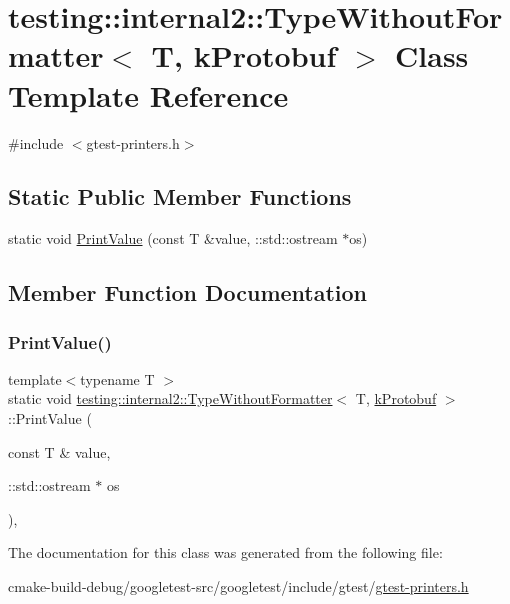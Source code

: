 \hypertarget{classtesting_1_1internal2_1_1TypeWithoutFormatter_3_01T_00_01kProtobuf_01_4}{}\section{testing\+::internal2\+::Type\+Without\+Formatter$<$ T, k\+Protobuf $>$ Class Template Reference}
\label{classtesting_1_1internal2_1_1TypeWithoutFormatter_3_01T_00_01kProtobuf_01_4}


{\ttfamily \#include $<$gtest-\/printers.\+h$>$}

\subsection*{Static Public Member Functions}
\begin{DoxyCompactItemize}
\item 
static void \mbox{\hyperlink{classtesting_1_1internal2_1_1TypeWithoutFormatter_3_01T_00_01kProtobuf_01_4_ac96fb775dc776f02da9a671ea0e04599}{Print\+Value}} (const T \&value, \+::std\+::ostream $\ast$os)
\end{DoxyCompactItemize}


\subsection{Member Function Documentation}
\mbox{\label{classtesting_1_1internal2_1_1TypeWithoutFormatter_3_01T_00_01kProtobuf_01_4_ac96fb775dc776f02da9a671ea0e04599}} 
\subsubsection{\texorpdfstring{PrintValue()}{PrintValue()}}
{\footnotesize\ttfamily template$<$typename T $>$ \\
static void \mbox{\hyperlink{classtesting_1_1internal2_1_1TypeWithoutFormatter}{testing\+::internal2\+::\+Type\+Without\+Formatter}}$<$ T, \mbox{\hyperlink{namespacetesting_1_1internal2_aeb8161b0b3ee503347b0662d7028fd57a14aaf98a2547ecf43eef0868d54b1383}{k\+Protobuf}} $>$\+::Print\+Value (\begin{DoxyParamCaption}\item[{const T \&}]{value,  }\item[{\+::std\+::ostream $\ast$}]{os }\end{DoxyParamCaption})\hspace{0.3cm}{\ttfamily [inline]}, {\ttfamily [static]}}



The documentation for this class was generated from the following file\+:\begin{DoxyCompactItemize}
\item 
cmake-\/build-\/debug/googletest-\/src/googletest/include/gtest/\mbox{\hyperlink{gtest-printers_8h}{gtest-\/printers.\+h}}\end{DoxyCompactItemize}
